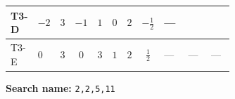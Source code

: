 \documentclass[8pt]{article}
\begin{document}
\begin{landscape}
\begin{longtable}{@{}llcccccc >{\raggedright\arraybackslash}p{0.21\linewidth} >{\raggedright\arraybackslash}p{0.21\linewidth} >{\raggedright\arraybackslash}p{0.21\linewidth}@{}}
\midrule
T3-D & $-2$ & $3$ & $-1$ & $1$ & $0$ & $2$ & $-\frac{1}{2}$ & --- & \scriptsize\adjustbox{max width=\linewidth}{$\begin{gathered} \frac{3^{\frac{3}{4}} lambda12Inv1 \overline{y_{1}} \overline{y_{2}}}{6 MF}\end{gathered}$} & \scriptsize\adjustbox{max width=\linewidth}{$\begin{gathered} \frac{3^{\frac{3}{4}} g_{1}^{2} \overline{y_{1}} \overline{y_{2}}}{8 MF}\end{gathered}$} \\
\midrule
T3-E & $0$ & $3$ & $0$ & $3$ & $1$ & $2$ & $\frac{1}{2}$ & --- & --- & --- \\
\midrule
\bottomrule
\end{longtable}
\clearpage
\noindent\textbf{Search name: }\texttt{2,2,5,11}\par\smallskip

\end{landscape}
\end{document}
